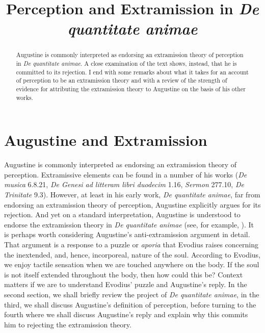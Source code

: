 \documentclass[12pt]{article}
\title{Perception and Extramission in \emph{De quantitate animae}}
\date{} %
\begin{document}
\maketitle
\begin{abstract}
	\noindent Augustine is commonly interpreted as endorsing an extramission theory of perception in \emph{De quantitate animae}. A close examination of the text shows, instead, that he is committed to its rejection. I end with some remarks about what it takes for an account of perception to be an extramission theory and with a review of the strength of evidence for attributing the extramission theory to Augustine on the basis of his other works.
\end{abstract}

\setlength{\parindent}{1em}


\section{Augustine and Extramission} %
\label{sec:augustine_and_extramission}

Augustine is commonly interpreted as endorsing an extramission theory of perception. Extramissive elements can be found in a number of his works (\emph{De musica} 6.8.21, \emph{De Genesi ad litteram libri duodecim} 1.16, \emph{Sermon} 277.10, \emph{De Trinitate} 9.3). However, at least in his early work, \emph{De quantitate animae}, far from endorsing an extramission theory of perception, Augustine explicitly argues for its rejection. And yet on a standard interpretation, Augustine is understood to endorse the extramission theory in \emph{De quantitate animae} (see, for example, \citealt[82--3]{ODaly:1987fq}). It is perhaps worth considering Augustine's anti-extramission argument in detail. That argument is a response to a puzzle or \emph{aporia} that Evodius raises concerning the inextended, and, hence, incorporeal, nature of the soul. According to Evodius, we enjoy tactile sensation when we are touched anywhere on the body. If the soul is not itself extended throughout the body, then how could this be? Context matters if we are to understand Evodius' puzzle and Augustine's reply. In the second section, we shall briefly review the project of \emph{De quantitate animae}, in the third, we shall discuss Augustine's definition of perception, before turning to the fourth where we shall discuss Augustine's reply and explain why this commits him to rejecting the extramission theory. 
\end{document}
